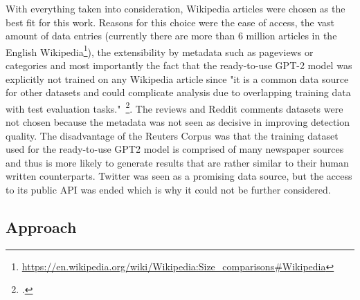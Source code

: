 With everything taken into consideration, Wikipedia articles were chosen as the best fit for this work. Reasons for this choice were the ease of access, the vast amount of data entries (currently there are more than 6 million articles in the English Wikipedia\footnote{\url{https://en.wikipedia.org/wiki/Wikipedia:Size_comparisons\#Wikipedia}}), the extensibility by metadata such as pageviews or categories and most importantly the fact that the ready-to-use GPT-2 model was explicitly not trained on any Wikipedia article since "it is a common data source for other datasets and could complicate analysis due to overlapping training data with test evaluation tasks."~\footcite[3]{radford2019language}. The reviews and Reddit comments datasets were not chosen because the metadata was not seen as decisive in improving detection quality. The disadvantage of the Reuters Corpus was that the training dataset used for the ready-to-use GPT2 model is comprised of many newspaper sources and thus is more likely to generate results that are rather similar to their human written counterparts. Twitter was seen as a promising data source, but the access to its public API was ended which is why it could not be further considered.





\subsection{Approach}
\label{sec:approach}


